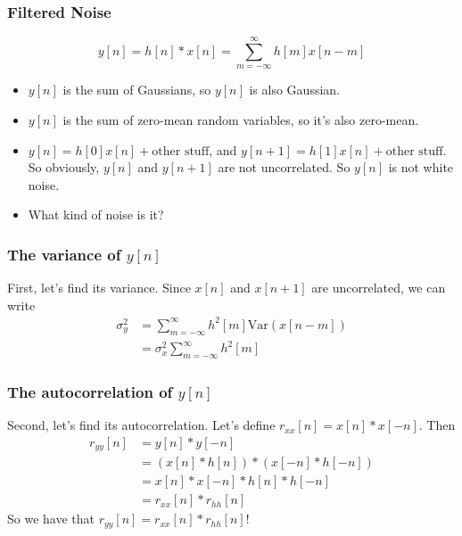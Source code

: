 \documentclass{beamer}
\begin{document}
\begin{frame}
  \frametitle{Filtered Noise}
  \[
  y[n] = h[n]\ast x[n] = \sum_{m=-\infty}^\infty h[m]x[n-m]
  \]
  \begin{itemize}
  \item $y[n]$ is the sum of Gaussians, so $y[n]$ is also Gaussian.
  \item $y[n]$ is the sum of zero-mean random variables, so it's also
    zero-mean.
  \item $y[n]=h[0]x[n]+\mbox{other stuff}$, and
    $y[n+1]=h[1]x[n]+\mbox{other stuff}$.  So obviously, $y[n]$ and
    $y[n+1]$ are not uncorrelated.  So $y[n]$ is not white noise.
  \item What kind of noise is it?
  \end{itemize}
\end{frame}

\begin{frame}
  \frametitle{The variance of $y[n]$}

  First, let's find its variance.  Since $x[n]$ and $x[n+1]$ are
  uncorrelated, we can write
  \begin{align*}
    \sigma_y^2 &= \sum_{m=-\infty}^\infty h^2[m] \mbox{Var}(x[n-m])\\
    &= \sigma_x^2 \sum_{m=-\infty}^\infty h^2[m]
  \end{align*}
\end{frame}

\begin{frame}
  \frametitle{The autocorrelation of $y[n]$}

  Second, let's find its autocorrelation.  Let's define $r_{xx}[n] = x[n]\ast x[-n]$.
  Then
  \begin{align*}
    r_{yy}[n] &= y[n] \ast y[-n]\\
    &= (x[n]\ast h[n]) \ast (x[-n]\ast h[-n])\\
    &= x[n]\ast x[-n]\ast h[n]\ast h[-n]\\
    &= r_{xx}[n] \ast r_{hh}[n]
  \end{align*}
  So we have that $r_{yy}[n] = r_{xx}[n]\ast r_{hh}[n]$!
\end{frame}
\end{document}
